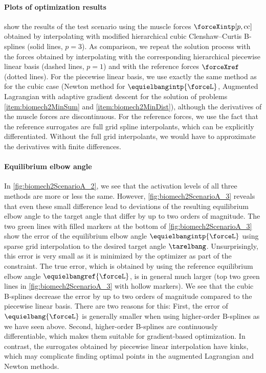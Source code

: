 \paragraph{Plots of optimization results}

show the results of the test scenario using the muscle forces
$\forceXintp[p,\cc]$ obtained by interpolating with
modified hierarchical cubic Clenshaw--Curtis B-splines (solid lines, $p = 3$).
As comparison, we repeat the solution process
with the forces obtained by interpolating with the
corresponding hierarchical piecewise linear basis (dashed lines, $p = 1$) and
with the reference forces $\forceXref$ (dotted lines).
For the piecewise linear basis,
we use exactly the same method as for the cubic case
(Newton method for $\equielbangintp{\forceL}$,
Augmented Lagrangian with adaptive gradient descent for the
solution of problems \ref{item:biomech2MinSum} and \ref{item:biomech2MinDist}),
although the derivatives of the muscle forces are discontinuous.
For the reference forces, we use the fact that the reference surrogates
are full grid spline interpolants, which can be explicitly differentiated.
Without the full grid interpolants,
we would have to approximate the derivatives with finite differences.

\vspace*{\fill}
\pagebreak

\paragraph{Equilibrium elbow angle}

In \cref{fig:biomech2ScenarioA_2}, we see that the activation levels
of all three methods are more or less the same.
However, \cref{fig:biomech2ScenarioA_3} reveals that even these small
difference lead to deviations of the resulting equilibrium elbow angle
to the target angle that differ by up to two orders of magnitude.
The two green lines with filled markers at the bottom of
\cref{fig:biomech2ScenarioA_3} show the error of
the equilibrium elbow angle $\equielbangintp{\forceL}$
using sparse grid interpolation to the desired target angle $\tarelbang$.
Unsurprisingly, this error is very small as
it is minimized by the optimizer as part of the constraint.
The true error, which is obtained by
using the reference equilibrium elbow angle $\equielbangref{\forceL}$,
is in general much larger
(top two green lines in \cref{fig:biomech2ScenarioA_3}
with hollow markers).
We see that the cubic B-splines decrease the error
by up to two orders of magnitude compared to the
piecewise linear basis.
There are two reasons for this:
First, the error of $\equielbang{\forceL}$ is generally smaller
when using higher-order B-splines as we have seen above.
Second, higher-order B-splines are continuously differentiable,
which makes them suitable for gradient-based optimization.
In contrast, the surrogates obtained by piecewise linear interpolation
have kinks, which may complicate finding optimal points
in the augmented Lagrangian and Newton methods.

